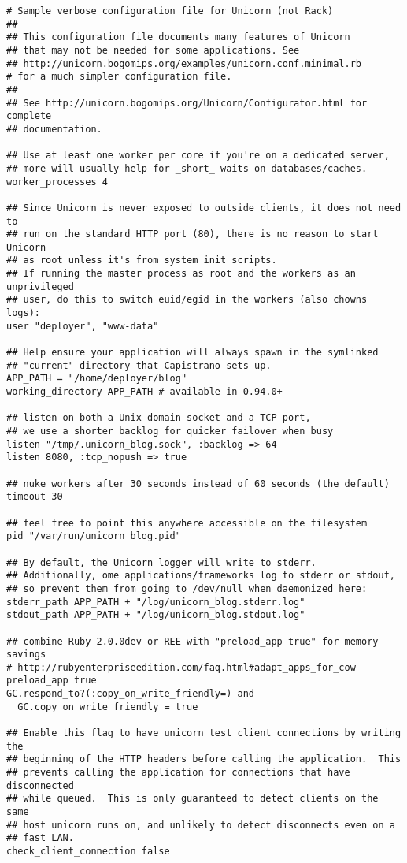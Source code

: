 \documentclass[a4paper]{book}
\newcounter{tab}[chapter]
\begin{document}
\begin{shaded}\begin{verbatim}
# Sample verbose configuration file for Unicorn (not Rack)
##
## This configuration file documents many features of Unicorn
## that may not be needed for some applications. See
## http://unicorn.bogomips.org/examples/unicorn.conf.minimal.rb
# for a much simpler configuration file.
##
## See http://unicorn.bogomips.org/Unicorn/Configurator.html for complete
## documentation.

## Use at least one worker per core if you're on a dedicated server,
## more will usually help for _short_ waits on databases/caches.
worker_processes 4

## Since Unicorn is never exposed to outside clients, it does not need to
## run on the standard HTTP port (80), there is no reason to start Unicorn
## as root unless it's from system init scripts.
## If running the master process as root and the workers as an unprivileged
## user, do this to switch euid/egid in the workers (also chowns logs):
user "deployer", "www-data"

## Help ensure your application will always spawn in the symlinked
## "current" directory that Capistrano sets up.
APP_PATH = "/home/deployer/blog"
working_directory APP_PATH # available in 0.94.0+

## listen on both a Unix domain socket and a TCP port,
## we use a shorter backlog for quicker failover when busy
listen "/tmp/.unicorn_blog.sock", :backlog => 64
listen 8080, :tcp_nopush => true

## nuke workers after 30 seconds instead of 60 seconds (the default)
timeout 30

## feel free to point this anywhere accessible on the filesystem
pid "/var/run/unicorn_blog.pid"

## By default, the Unicorn logger will write to stderr.
## Additionally, ome applications/frameworks log to stderr or stdout,
## so prevent them from going to /dev/null when daemonized here:
stderr_path APP_PATH + "/log/unicorn_blog.stderr.log"
stdout_path APP_PATH + "/log/unicorn_blog.stdout.log"

## combine Ruby 2.0.0dev or REE with "preload_app true" for memory savings
# http://rubyenterpriseedition.com/faq.html#adapt_apps_for_cow
preload_app true
GC.respond_to?(:copy_on_write_friendly=) and
  GC.copy_on_write_friendly = true

## Enable this flag to have unicorn test client connections by writing the
## beginning of the HTTP headers before calling the application.  This
## prevents calling the application for connections that have disconnected
## while queued.  This is only guaranteed to detect clients on the same
## host unicorn runs on, and unlikely to detect disconnects even on a
## fast LAN.
check_client_connection false


\end{verbatim}
\end{shaded}
\end{document}
